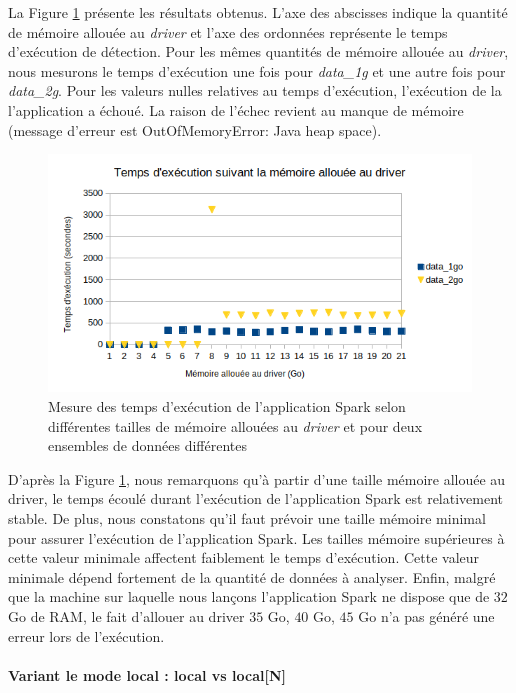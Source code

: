 La Figure 	\ref{fig:variantdrivermemory} présente les résultats obtenus. L'axe des abscisses indique la quantité de mémoire allouée au \textit{driver} et l'axe des ordonnées représente le temps d'exécution de détection. Pour les mêmes quantités de mémoire allouée au \textit{driver}, nous mesurons le temps d'exécution une fois pour  \textit{data\_1g}  et une autre fois pour  \textit{data\_2g}.
Pour les valeurs nulles relatives au temps d'exécution, l'exécution de la l'application a échoué. La raison de l'échec revient au manque de mémoire (message d'erreur est OutOfMemoryError: Java heap space).
\begin{figure}[H]
	\centering
	\captionsetup{justification=centering}
	\includegraphics[width=1\linewidth]{illustrations/variant_driver_memory}
	\caption{Mesure des temps d'exécution de l'application Spark selon différentes tailles de mémoire allouées au \textit{driver} et pour deux ensembles de données différentes}
	\label{fig:variantdrivermemory}
\end{figure}

D'après la Figure 	\ref{fig:variantdrivermemory}, nous remarquons qu'à partir d'une taille mémoire allouée au driver, le temps écoulé durant l'exécution de l'application Spark est relativement stable. De plus, nous constatons qu'il faut prévoir une taille mémoire minimal pour assurer l'exécution de l'application Spark. Les tailles mémoire supérieures à cette valeur minimale affectent faiblement le temps d'exécution.  Cette valeur minimale dépend fortement de la quantité de données à analyser. Enfin, malgré que la machine sur laquelle nous lançons l'application Spark ne dispose que de $ 32 $ Go de RAM, le fait d'allouer au driver $ 35 $ Go, $ 40$ Go, $ 45 $ Go n'a pas généré une erreur lors de l'exécution.

\paragraph{Variant le mode local : local vs local[N]}~

